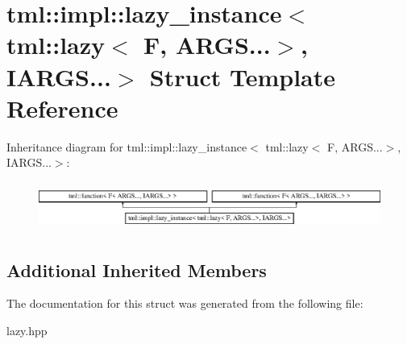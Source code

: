 \hypertarget{structtml_1_1impl_1_1lazy__instance_3_01tml_1_1lazy_3_01F_00_01ARGS_8_8_8_4_00_01IARGS_8_8_8_4}{\section{tml\+:\+:impl\+:\+:lazy\+\_\+instance$<$ tml\+:\+:lazy$<$ F, A\+R\+G\+S...$>$, I\+A\+R\+G\+S...$>$ Struct Template Reference}
\label{structtml_1_1impl_1_1lazy__instance_3_01tml_1_1lazy_3_01F_00_01ARGS_8_8_8_4_00_01IARGS_8_8_8_4}
}
Inheritance diagram for tml\+:\+:impl\+:\+:lazy\+\_\+instance$<$ tml\+:\+:lazy$<$ F, A\+R\+G\+S...$>$, I\+A\+R\+G\+S...$>$\+:\begin{figure}[H]
\begin{center}
\leavevmode
\includegraphics[height=1.604584cm]{structtml_1_1impl_1_1lazy__instance_3_01tml_1_1lazy_3_01F_00_01ARGS_8_8_8_4_00_01IARGS_8_8_8_4}
\end{center}
\end{figure}
\subsection*{Additional Inherited Members}


The documentation for this struct was generated from the following file\+:\begin{DoxyCompactItemize}
\item 
lazy.\+hpp\end{DoxyCompactItemize}
